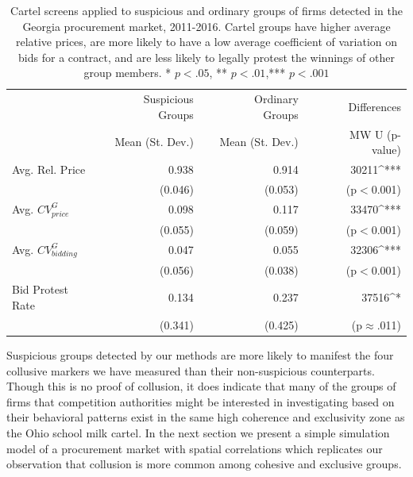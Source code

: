 \renewcommand{\tabcolsep}{2pt}
\begin{table}[]
\begin{tabular}{@{}lrrrrr@{}}
& Suspicious Groups & \phantom{a}& Ordinary Groups & \phantom{a} & Differences \\
&Mean (St. Dev.) &&Mean (St. Dev.) &&MW U (p-value)\\  \midrule
Avg. Rel. Price & 0.938 && 0.914&&30211^{***}  \\
&  (0.046) && (0.053) &&(p$<$0.001)  \\
Avg. $CV_{price}^{G}$ & 0.098 && 0.117&& 33470^{***}   \\
 & (0.055) && (0.059) && (p$<$0.001)  \\
Avg. $CV_{bidding}^{G}$ & 0.047 && 0.055 && 32306^{***}  \\
& (0.056) && (0.038) && (p$<$0.001)  \\
Bid Protest Rate & 0.134  && 0.237 && 37516^{*} \\
& (0.341) &&(0.425) && (p$\approx$.011)\\
\bottomrule
\end{tabular}
\caption[Cartel screen comparisons.]{Cartel screens applied to suspicious and ordinary groups of firms detected in the Georgia procurement market, 2011-2016. Cartel groups have higher average relative prices, are more likely to have a low average coefficient of variation on bids for a contract, and are less likely to legally protest the winnings of other group members. * $p < .05$, ** $p <.01$,*** $p <.001$ }
\label{tab:ga_stats_table}
\end{table}
\renewcommand{\tabcolsep}{6pt}


Suspicious groups detected by our methods are more likely to manifest the four collusive markers we have measured than their non-suspicious counterparts. Though this is no proof of collusion, it does indicate that many of the groups of firms that competition authorities might be interested in investigating based on their behavioral patterns exist in the same high coherence and exclusivity zone as the Ohio school milk cartel. In the next section we present a simple simulation model of a procurement market with spatial correlations which replicates our observation that collusion is more common among cohesive and exclusive groups.


